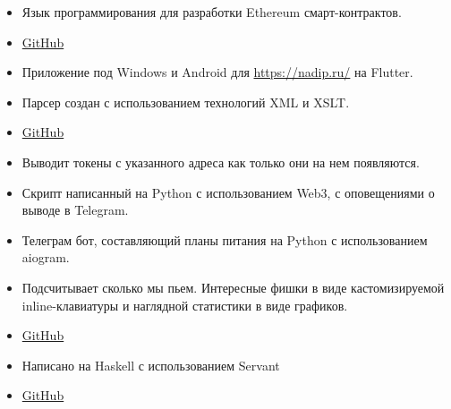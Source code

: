 \documentclass[10pt,a4paper,ragged2e]{altacv}
\begin{document}
\begin{itemize}
  \item Язык программирования для разработки Ethereum смарт-контрактов.
  \item \href{https://github.com/sl1depengwyn/elixireum}{GitHub}
\end{itemize}
\smallskip
{}
\begin{itemize}
\item Приложение под Windows и Android для \newline \url{https://nadip.ru/} на Flutter.
\end{itemize}
\smallskip
{}
\begin{itemize}
\item Парсер создан с использованием технологий XML и XSLT.
\item \href{https://github.com/YeslieSnayder/eo}{GitHub}
\end{itemize}
\smallskip
{}
\begin{itemize}
\item Выводит токены с указанного адреса как только они на нем появляются.
\item Скрипт написанный на Python с использованием Web3, с оповещениями о выводе в Telegram.
\end{itemize}
\smallskip
{}
\begin{itemize}
\item Телеграм бот, составляющий планы питания на Python с использованием aiogram.
\end{itemize}
\smallskip
{}
\begin{itemize}
\item Подсчитывает сколько мы пьем. Интересные фишки в виде кастомизируемой inline-клавиатуры и наглядной статистики в виде графиков.
\item \href{https://github.com/sl1depengwyn/drink-bot}{GitHub}
\end{itemize}
\smallskip
{}
\begin{itemize}
\item Написано на Haskell с использованием Servant
\item \href{https://github.com/sl1depengwyn/drink-bot-api}{GitHub}
\end{itemize}
\end{document}
